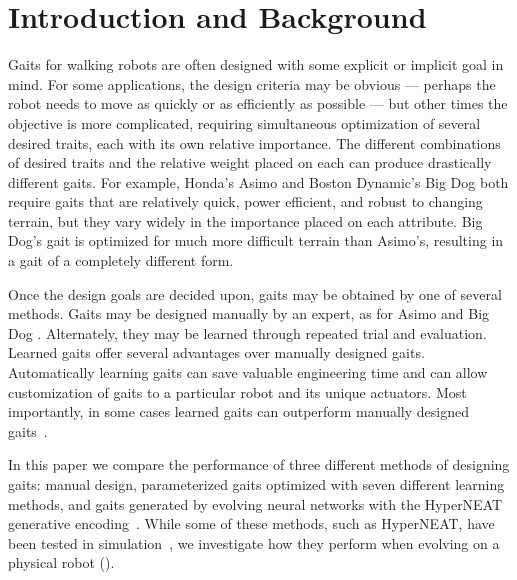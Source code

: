 \section{Introduction and Background}



Gaits for walking robots are often designed with some explicit or
implicit goal in mind.  For some applications, the design criteria may
be obvious --- perhaps the robot needs to move as quickly or as
efficiently as possible --- but other times the objective is more complicated,
requiring simultaneous optimization of several desired traits, each
with its own relative importance.  The different combinations of desired traits and the relative weight placed on each can produce drastically different gaits.    For example, Honda's Asimo
\cite{chestnutt2006footstep} and Boston Dynamic's Big Dog \cite{raibert2008bigdog} both require
gaits that are relatively quick, power efficient, and robust to
changing terrain, but they vary widely in the importance placed
on each attribute.  Big Dog's gait is optimized for much more difficult terrain than Asimo's, resulting in a gait of a completely different form.

Once the design goals are decided upon, gaits may be obtained by one of several methods.  Gaits may be designed manually by an expert, as for Asimo and Big Dog \cite{chestnutt2006footstep, raibert2008bigdog}.  Alternately, they may be learned through repeated trial and evaluation.  Learned gaits offer several advantages over manually designed gaits.  Automatically learning gaits can save valuable engineering time and can allow customization of gaits to a particular robot and its unique actuators.  Most importantly, in some cases learned gaits can outperform manually designed gaits~\cite{hornby2005autonomous, valsalam2008modular}.

In this paper we compare the performance of three different methods of designing gaits: manual design, parameterized gaits optimized with seven different learning methods, and gaits generated by evolving neural networks with the HyperNEAT generative encoding~\cite{stanley2009hypercube}. While some of these methods, such as HyperNEAT, have been tested in simulation~\cite{clune2009evolving, clune2011performance}, we investigate how they perform when evolving on a physical robot (). 

